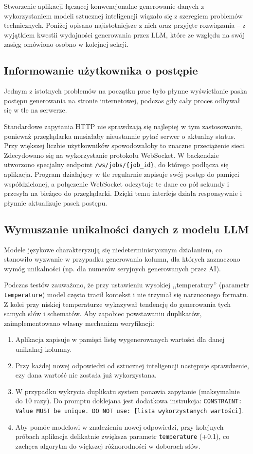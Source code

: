 Stworzenie aplikacji łączącej konwencjonalne generowanie danych z wykorzystaniem modeli sztucznej inteligencji wiązało się z szeregiem problemów technicznych. Poniżej opisano najistotniejsze z nich oraz przyjęte rozwiązania -- z wyjątkiem kwestii wydajności generowania przez \gls{LLM}, które ze względu na swój zasięg omówiono osobno w kolejnej sekcji.

\subsection*{Informowanie użytkownika o postępie}
Jednym z istotnych problemów na początku prac było płynne wyświetlanie paska postępu generowania na stronie internetowej, podczas gdy cały proces odbywał się w tle na serwerze.

Standardowe zapytania \gls{HTTP} nie sprawdzają się najlepiej w tym zastosowaniu, ponieważ przeglądarka musiałaby nieustannie pytać serwer o aktualny status. Przy większej liczbie użytkowników spowodowałoby to znaczne przeciążenie sieci. Zdecydowano się na wykorzystanie protokołu WebSocket. W backendzie utworzono specjalny endpoint \texttt{/ws/jobs/\{job\_id\}}, do którego podłącza się aplikacja. Program działający w tle regularnie zapisuje swój postęp do pamięci współdzielonej, a połączenie WebSocket odczytuje te dane co pół sekundy i przesyła na bieżąco do przeglądarki. Dzięki temu interfejs działa responsywnie i płynnie aktualizuje pasek postępu.

\subsection*{Wymuszanie unikalności danych z modelu LLM}
Modele językowe charakteryzują się niedeterministycznym działaniem, co stanowiło wyzwanie w przypadku generowania kolumn, dla których zaznaczono wymóg unikalności (np. dla numerów seryjnych generowanych przez AI).

Podczas testów zauważono, że przy ustawieniu wysokiej ,,temperatury'' (parametr \texttt{temperature}) model często tracił kontekst i nie trzymał się narzuconego formatu. Z kolei przy niskiej temperaturze wykazywał tendencję do generowania tych samych słów i schematów. Aby zapobiec powstawaniu duplikatów, zaimplementowano własny mechanizm weryfikacji:
\begin{enumerate}
    \item Aplikacja zapisuje w pamięci listę wygenerowanych wartości dla danej unikalnej kolumny.
    \item Przy każdej nowej odpowiedzi od sztucznej inteligencji następuje sprawdzenie, czy dana wartość nie została już wykorzystana.
    \item W przypadku wykrycia duplikatu system ponawia zapytanie (maksymalnie do 10 razy). Do promptu doklejana jest dodatkowa instrukcja: \texttt{CONSTRAINT: Value MUST be unique. DO NOT use: [lista wykorzystanych wartości]}.
    \item Aby pomóc modelowi w znalezieniu nowej odpowiedzi, przy kolejnych próbach aplikacja delikatnie zwiększa parametr \texttt{temperature} (+0.1), co zachęca algorytm do większej różnorodności w doborach słów.
\end{enumerate}

